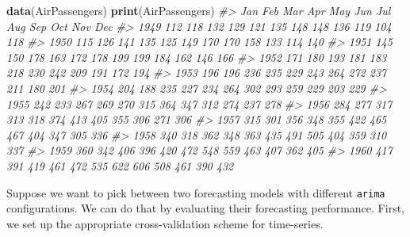 \documentclass[12pt, krantz2,]{book}
\newenvironment{Shaded}{\begin{snugshade}}{\end{snugshade}}
\newcommand{\CommentTok}[1]{\textcolor[rgb]{0.56,0.35,0.01}{\textit{#1}}}
\newcommand{\DataTypeTok}[1]{\textcolor[rgb]{0.13,0.29,0.53}{#1}}
\newcommand{\DecValTok}[1]{\textcolor[rgb]{0.00,0.00,0.81}{#1}}
\newcommand{\KeywordTok}[1]{\textcolor[rgb]{0.13,0.29,0.53}{\textbf{#1}}}
\newcommand{\NormalTok}[1]{#1}
\newcommand{\StringTok}[1]{\textcolor[rgb]{0.31,0.60,0.02}{#1}}
\theoremstyle{definition}
\theoremstyle{definition}
\theoremstyle{definition}
\newcommand{\1}{\mathbbm{1}}
\begin{document}
\begin{Shaded}
\begin{Highlighting}[]
\KeywordTok{data}\NormalTok{(AirPassengers)}
\KeywordTok{print}\NormalTok{(AirPassengers)}
\CommentTok{#>      Jan Feb Mar Apr May Jun Jul Aug Sep Oct Nov Dec}
\CommentTok{#> 1949 112 118 132 129 121 135 148 148 136 119 104 118}
\CommentTok{#> 1950 115 126 141 135 125 149 170 170 158 133 114 140}
\CommentTok{#> 1951 145 150 178 163 172 178 199 199 184 162 146 166}
\CommentTok{#> 1952 171 180 193 181 183 218 230 242 209 191 172 194}
\CommentTok{#> 1953 196 196 236 235 229 243 264 272 237 211 180 201}
\CommentTok{#> 1954 204 188 235 227 234 264 302 293 259 229 203 229}
\CommentTok{#> 1955 242 233 267 269 270 315 364 347 312 274 237 278}
\CommentTok{#> 1956 284 277 317 313 318 374 413 405 355 306 271 306}
\CommentTok{#> 1957 315 301 356 348 355 422 465 467 404 347 305 336}
\CommentTok{#> 1958 340 318 362 348 363 435 491 505 404 359 310 337}
\CommentTok{#> 1959 360 342 406 396 420 472 548 559 463 407 362 405}
\CommentTok{#> 1960 417 391 419 461 472 535 622 606 508 461 390 432}
\end{Highlighting}
\end{Shaded}

Suppose we want to pick between two forecasting models with different \texttt{arima}
configurations. We can do that by evaluating their forecasting performance.
First, we set up the appropriate cross-validation scheme for time-series.

\begin{Shaded}
\end{Shaded}
\end{document}
